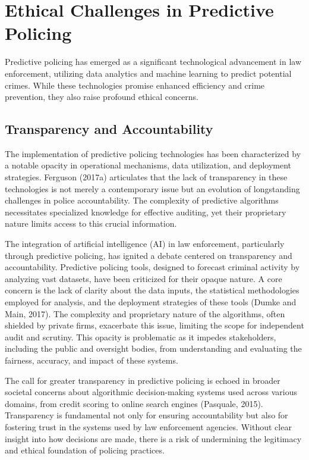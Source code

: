 \documentclass[man, noextraspace]{apa7} %
\begin{document}
\section{Ethical Challenges in Predictive Policing}
Predictive policing has emerged as a significant technological advancement in law enforcement, utilizing data analytics and machine learning to predict potential crimes. While these technologies promise enhanced efficiency and crime prevention, they also raise profound ethical concerns.  

 

\subsection{Transparency and Accountability}

The implementation of predictive policing technologies has been characterized by a notable opacity in operational mechanisms, data utilization, and deployment strategies. Ferguson (2017a) articulates that the lack of transparency in these technologies is not merely a contemporary issue but an evolution of longstanding challenges in police accountability. The complexity of predictive algorithms necessitates specialized knowledge for effective auditing, yet their proprietary nature limits access to this crucial information. 


The integration of artificial intelligence (AI) in law enforcement, particularly through predictive policing, has ignited a debate centered on transparency and accountability. Predictive policing tools, designed to forecast criminal activity by analyzing vast datasets, have been criticized for their opaque nature. A core concern is the lack of clarity about the data inputs, the statistical methodologies employed for analysis, and the deployment strategies of these tools (Dumke and Main, 2017). The complexity and proprietary nature of the algorithms, often shielded by private firms, exacerbate this issue, limiting the scope for independent audit and scrutiny. This opacity is problematic as it impedes stakeholders, including the public and oversight bodies, from understanding and evaluating the fairness, accuracy, and impact of these systems. 


The call for greater transparency in predictive policing is echoed in broader societal concerns about algorithmic decision-making systems used across various domains, from credit scoring to online search engines (Pasquale, 2015). Transparency is fundamental not only for ensuring accountability but also for fostering trust in the systems used by law enforcement agencies. Without clear insight into how decisions are made, there is a risk of undermining the legitimacy and ethical foundation of policing practices. 
\end{document}
